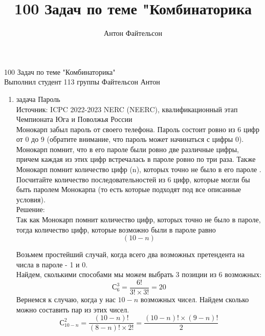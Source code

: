 \documentclass[a4paper,14pt]{extreport} %
\title{100 Задач по теме "Комбинаторика}
\author{Антон Файтельсон}
\date{}
\begin{document}
			\begin{flushleft}
				\Large 100 Задач по теме "Комбинаторика"		\\
				Выполнил студент 113 группы Файтельсон Антон
				
			\end{flushleft}
			\begin{center}
				\begin{enumerate}
					\item {\large задача  Пароль}\\
						Источник: ICPC 2022-2023 NERC (NEERC), квалификационный этап Чемпионата Юга и Поволжья России \\
						\vspace{15pt}
						Монокарп забыл пароль от своего телефона. Пароль состоит ровно из 6 цифр от 0 до 9 (обратите внимание, что пароль может начинаться с цифры 0).\\
						\vspace{15pt}
						Монокарп помнит, что в его пароле были ровно две различные цифры, причем каждая из этих цифр встречалась в пароле ровно по три раза. Также Монокарп помнит количество цифр (n), которых точно не было в его пароле . \\
						\vspace{15pt}
						Посчитайте количество последовательностей из 6 цифр, которые могли бы быть паролем Монокарпа (то есть которые подходят под все описанные условия).\\
						\vspace{15pt}
						{\large Решение:}\\
						Так как Монокарп помнит количество цифр, которых точно не было в пароле, тогда количество цифр, которые возможно были в пароле равно 
						\begin{equation}
							(10 - n )
						\end{equation}
						
						Возьмем простейший случай, когда всего два возможных претендента на числа в пароле - 1 и 0.\\
						Найдем, сколькими способами мы можем выбрать 3 позиции из 6 возможных:\\
						\begin{equation}
							С_6^3 = \frac{6!}{3!\times3!} = 20
						\end{equation}
						\newpage
						\vspace{15pt} 
						Вернемся к случаю, когда у нас \(10 - n\) возможных чисел. Найдем сколько можно составить пар из этих чисел.
						\begin{equation}
							С_{10-n}^2 = \frac{(10-n)!}{(8-n)!\times2!} = \frac{(10-n)!\times(9-n)!}{2}
						\end{equation}
						

\end{enumerate}
\end{center}
\end{document}
